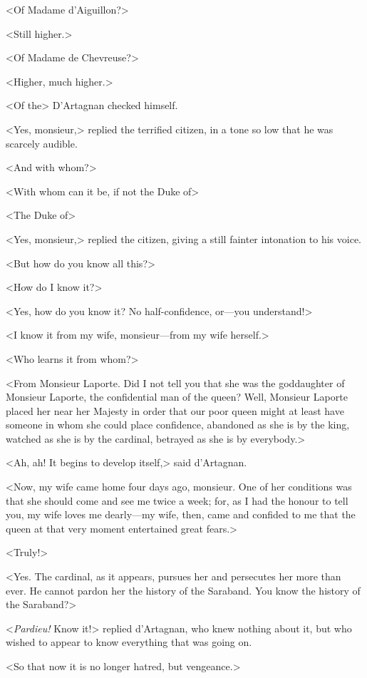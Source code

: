 <Of Madame d'Aiguillon?> 

<Still higher.> 

<Of Madame de Chevreuse?> 

<Higher, much higher.> 

<Of the\longdash> D'Artagnan checked himself. 

<Yes, monsieur,> replied the terrified citizen, in a tone so low that he was scarcely audible. 

<And with whom?> 

<With whom can it be, if not the Duke of\longdash> 

<The Duke of\longdash> 

<Yes, monsieur,> replied the citizen, giving a still fainter intonation to his voice. 

<But how do you know all this?> 

<How do I know it?> 

<Yes, how do you know it? No half-confidence, or---you understand!> 

<I know it from my wife, monsieur---from my wife herself.> 

<Who learns it from whom?> 

<From Monsieur Laporte. Did I not tell you that she was the goddaughter of Monsieur Laporte, the confidential man of the queen? Well, Monsieur Laporte placed her near her Majesty in order that our poor queen might at least have someone in whom she could place confidence, abandoned as she is by the king, watched as she is by the cardinal, betrayed as she is by everybody.> 

<Ah, ah! It begins to develop itself,> said d'Artagnan. 

<Now, my wife came home four days ago, monsieur. One of her conditions was that she should come and see me twice a week; for, as I had the honour to tell you, my wife loves me dearly---my wife, then, came and confided to me that the queen at that very moment entertained great fears.> 

<Truly!> 

<Yes. The cardinal, as it appears, pursues her and persecutes her more than ever. He cannot pardon her the history of the Saraband. You know the history of the Saraband?> 

<\textit{Pardieu!} Know it!> replied d'Artagnan, who knew nothing about it, but who wished to appear to know everything that was going on. 

<So that now it is no longer hatred, but vengeance.> 

